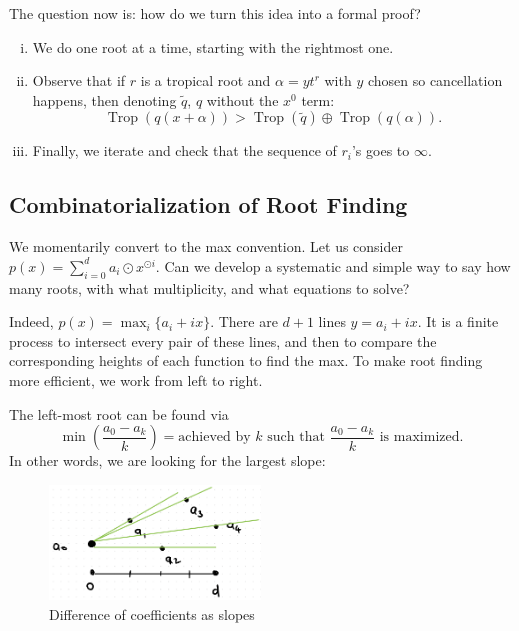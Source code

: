 \documentclass[12pt]{memoir}
\DeclareMathOperator{\Trop}{Trop}
\theoremstyle{definition}
\def\al{\alpha}
\begin{document}
The question now is: how do we turn this idea into a formal proof?
\begin{enumerate}[i.]
    \item We do one root at a time, starting with the rightmost one.
    \item Observe that if $r$ is a tropical root and $\al=yt^r$ with $y$ chosen so cancellation happens, then denoting $\tilde{q}$, $q$ without the $x^0$ term:
    $$\Trop(q(x+\al))>\Trop(\tilde{q})\oplus\Trop(q(\al)).$$
    \item Finally, we iterate and check that the sequence of $r_i$'s goes to $\infty$.
\end{enumerate}




\subsection{Combinatorialization of Root Finding}

We momentarily convert to the max convention. Let us consider $p(x) = \sum\limits_{i=0}^d a_i \odot x^{\odot i}$. Can we develop a systematic and simple way to say how many roots, with what multiplicity, and what equations to solve?\par 
Indeed, $p(x) = \max_i \{a_i + ix\}$. There are $d+1$ lines $y= a_i + ix$. It is a finite process to intersect every pair of these lines, and then to compare the corresponding heights of each function to find the max. To make root finding more efficient, we work from left to right.\par
The left-most root can be found via
$$\min\left(\frac{a_0-a_k}{k}\right)=\text{achieved by }k\text{ such that }\frac{a_0-a_k}{k}\text{ is maximized}.$$
In other words, we are looking for the largest slope:
\begin{figure}[h!]
    \centering
    \includegraphics[width=0.5\textwidth]{figs/fig6-1BiggestSlope.png}
    \caption{Difference of coefficients as slopes}
    \label{fig:6.1-BiggestSlope}
\end{figure}
\end{document}
